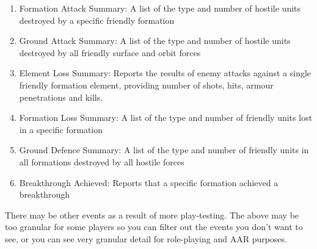\documentclass[../../Aurora C# unofficial manual.tex]{subfiles}
\begin{document}
\begin{enumerate}
		\item Formation Attack Summary: A list of the type and number of hostile units destroyed by a specific friendly formation
		\item Ground Attack Summary: A list of the type and number of hostile units destroyed by all friendly surface and orbit forces
		\item Element Loss Summary: Reports the results of enemy attacks against a single friendly formation element, providing number of shots, hits, armour penetrations and kills.
		\item Formation Loss Summary: A list of the type and number of friendly units lost in a specific formation
		\item Ground Defence Summary: A list of the type and number of friendly units in all formations destroyed by all hostile forces
		\item Breakthrough Achieved: Reports that a specific formation achieved a breakthrough
	\end{enumerate}

	There may be other events as a result of more play-testing. The above may be too granular for some players so you can filter out the events you don't want to see, or you can see very granular detail for role-playing and AAR purposes.
\end{document}
